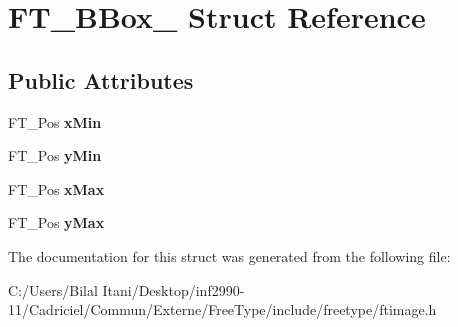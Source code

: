 \hypertarget{struct_f_t___b_box__}{}\section{F\+T\+\_\+\+B\+Box\+\_\+ Struct Reference}
\label{struct_f_t___b_box__}
\subsection*{Public Attributes}
\begin{DoxyCompactItemize}
\item 
F\+T\+\_\+\+Pos {\bfseries x\+Min}\hypertarget{struct_f_t___b_box___a1f2a5d0565d496c1d41e43d018f45add}{}\label{struct_f_t___b_box___a1f2a5d0565d496c1d41e43d018f45add}

\item 
F\+T\+\_\+\+Pos {\bfseries y\+Min}\hypertarget{struct_f_t___b_box___a959ca1d5bc1c5338da0d85c8e7135f4e}{}\label{struct_f_t___b_box___a959ca1d5bc1c5338da0d85c8e7135f4e}

\item 
F\+T\+\_\+\+Pos {\bfseries x\+Max}\hypertarget{struct_f_t___b_box___ac6da5c44f4cb7b97eef1f438eb69c0ec}{}\label{struct_f_t___b_box___ac6da5c44f4cb7b97eef1f438eb69c0ec}

\item 
F\+T\+\_\+\+Pos {\bfseries y\+Max}\hypertarget{struct_f_t___b_box___a77084921589f386a8a593ae1f25b1569}{}\label{struct_f_t___b_box___a77084921589f386a8a593ae1f25b1569}

\end{DoxyCompactItemize}


The documentation for this struct was generated from the following file\+:\begin{DoxyCompactItemize}
\item 
C\+:/\+Users/\+Bilal Itani/\+Desktop/inf2990-\/11/\+Cadriciel/\+Commun/\+Externe/\+Free\+Type/include/freetype/ftimage.\+h\end{DoxyCompactItemize}
